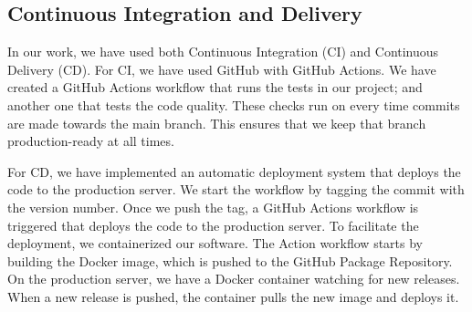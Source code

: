 \subsection{Continuous Integration and Delivery}
In our work, we have used both Continuous Integration (CI) and Continuous Delivery (CD).
For CI, we have used GitHub with GitHub Actions. We have created a GitHub Actions workflow that
runs the tests in our project; and another one that tests the code quality. These checks run
on every time commits are made towards the main branch. This ensures that we keep that branch production-ready
at all times.

For CD, we have implemented an automatic deployment system that deploys the code to the production server.
We start the workflow by tagging the commit with the version number. Once we push the tag, a GitHub Actions
workflow is triggered that deploys the code to the production server.
To facilitate the deployment, we containerized our software. The Action workflow starts by building the
Docker image, which is pushed to the GitHub Package Repository. On the production server, we have a Docker 
container watching for new releases. When a new release is pushed, the container pulls the new image and
deploys it.
